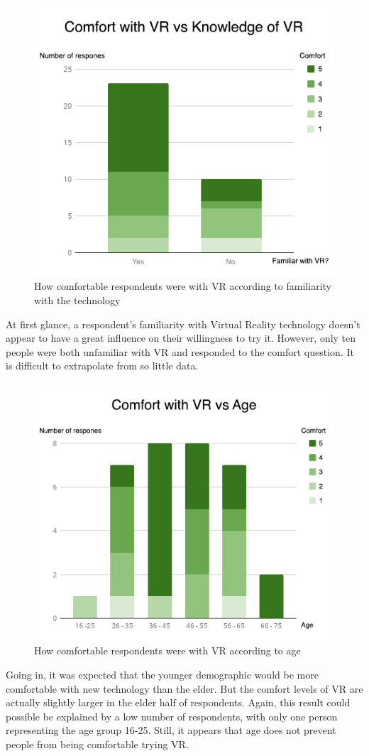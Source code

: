 			\begin{figure}[H]
				\centering
				\includegraphics[width=0.6\linewidth]{figure/Analysis/comfort.png}
				\caption{How comfortable respondents were with VR according to familiarity with the technology}
				\label{fig:comfort}
			\end{figure}
			
			At first glance, a respondent's familiarity with Virtual Reality technology doesn't appear to have a great influence on their willingness to try it. However, only ten people were both unfamiliar with VR and responded to the comfort question. It is difficult to extrapolate from so little data.
			
			\begin{figure}[H]
				\centering
				\includegraphics[width=0.6\linewidth]{figure/Analysis/vrcomfort.png}
				\caption{How comfortable respondents were with VR according to age}
				\label{fig:vrcomfort}
			\end{figure}
			
			Going in, it was expected that the younger demographic would be more comfortable with new technology than the elder. But the comfort levels of VR are actually slightly larger in the elder half of respondents. Again, this result could possible be explained by a low number of respondents, with only one person representing the age group 16-25. Still, it appears that age does not prevent people from being comfortable trying VR.
			

